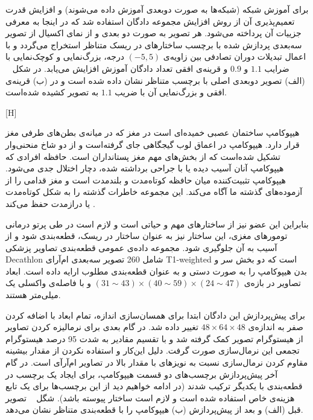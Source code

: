 برای آموزش شبکه (شبکه‌ها به صورت دوبعدی آموزش داده می‌شوند) و افزایش قدرت تعمیم‌پذیری آن از روش افزایش مجموعه دادگان استفاده شد که در اینجا به معرفی جزییات آن پرداخته می‌شود. هر تصویر به صورت دو بعدی و از نمای اکسیال از تصویر سه‌بعدی پردازش شده با برچسب ساختارهای در ریسک متناظر استخراج می‌گردد و با اعمال تبدیلات دوران تصادفی بین زاویه‌ی $(-5,5)$ درجه، بزرگ‌نمایی و کوچک‌نمایی با ضرایب $1.1$ و $0.9$ و قرینه‌ی افقی تعداد دادگان آموزش افزایش می‌یابد. در شکل ~ (الف) تصویر دوبعدی اصلی با برچسب‌ متناظر نشان داده شده است و در (ب) قرینه‌ی افقی و بزرگ‌نمایی آن با ضریب $1.1$ به تصویر کشیده شده‌است.

[H]


هیپوکامپ ساختمان عصبی خمیده‌ای است در مغز که در میانه‌ی بطن‌های طرفی مغز قرار دارد. هیپوکامپ در اعماق لوب گیجگاهی جای گرفته‌است و از دو شاخ منحنی‌وار تشکیل شده‌است که از بخش‌های مهم مغز پستانداران است. حافظه افرادی که هیپوکامپ آنان آسیب دیده یا با جراحی برداشته شده، دچار اختلال جدی می‌شود. هیپوکامپ تثبیت‌کننده میان حافظه کوتاه‌مدت و بلندمدت است و مغز قدامی را از آزموده‌های گذشته ما آگاه می‌کند. این مجموعه خاطرات گذشته را به شکل کوتاه‌مدت یا درازمدت حفظ می‌کند . 

بنابراین این عضو نیز از ساختارهای مهم و حیاتی است و لازم است در طی پرتو درمانی تومورهای مغزی، این ساختار نیز به عنوان ساختار در ریسک، قطعه‌بندی شود و از آسیب به آن جلوگیری شود. مجموعه داده‌ی عمومی قطعه‌بندی تصاویر پزشکی Decathlon  شامل 260 تصویر سه‌بعدی ام‌آرای T1-weighted است که دو بخش سر و بدن هیپوکامپ را به صورت دستی و به عنوان قطعه‌بندی مطلوب ارایه داده است. ابعاد تصاویر در بازه‌ی 
$(31\sim43)\times(40\sim59)\times(24\sim47)$
و با فاصله‌ی واکسلی یک میلی‌متر هستند. 

برای پیش‌پردازش این دادگان ابتدا برای همسان‌سازی اندازه، تمام ابعاد با اضافه کردن صفر به اندازه‌ی $48\times64\times48$ تغییر داده شد. در گام‌ بعدی برای نرمالیزه کردن تصاویر از هیستوگرام تصویر کمک گرفته شد و با تقسیم مقادیر به شدت 95 درصد هیستوگرام تجمعی این نرمال‌سازی صورت گرفت. دلیل این‌کار و استفاده نکردن از مقدار بیشینه مقاوم کردن نرمال‌سازی نسبت به نویزهای با مقدار بالا در تصاویر ام‌آرآی است. در گام آخر پیش‌پردازش برچسب‌های دو قسمت هیپوکامپ، برای ایجاد یک برچسب در قطعه‌بندی با یکدیگر ترکیب شدند (در ادامه خواهیم دید از این برچسب‌ها برای یک تابع هزینه‌ی خاص استفاده شده است و لازم است ساختار پیوسته باشد). شگل ~ تصویر قبل (الف) و بعد از پیش‌پردازش (ب) هیپوکامپ را با قطعه‌بندی متناظر نشان می‌دهد.

